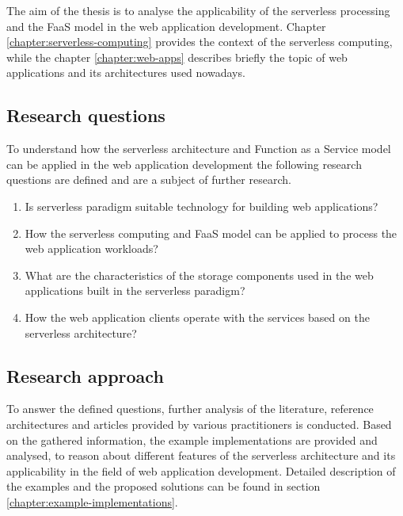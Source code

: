 The aim of the thesis is to analyse the applicability of the serverless processing and the FaaS model in the web application development. Chapter \ref{chapter:serverless-computing} provides the context of the serverless computing, while the chapter \ref{chapter:web-apps} describes briefly the topic of web applications and its architectures used nowadays. 

\subsection{Research questions}

To understand how the serverless architecture and Function as a Service model can be applied in the web application development the following research questions are defined and are a subject of further research.

\begin{enumerate}
    \item Is serverless paradigm suitable technology for building web applications?
    \item How the serverless computing and FaaS model can be applied to process the web application workloads?
    \item What are the characteristics of the storage components used in the web applications built in the serverless paradigm?
    \item How the web application clients operate with the services based on the serverless architecture?
\end{enumerate}

\subsection{Research approach}

To answer the defined questions, further analysis of the literature, reference architectures and articles provided by various practitioners is conducted.
Based on the gathered information, the example implementations are provided and analysed, to reason about different features of the serverless architecture and its applicability in the field of web application development.
Detailed description of the examples and the proposed solutions can be found in section \ref{chapter:example-implementations}.

